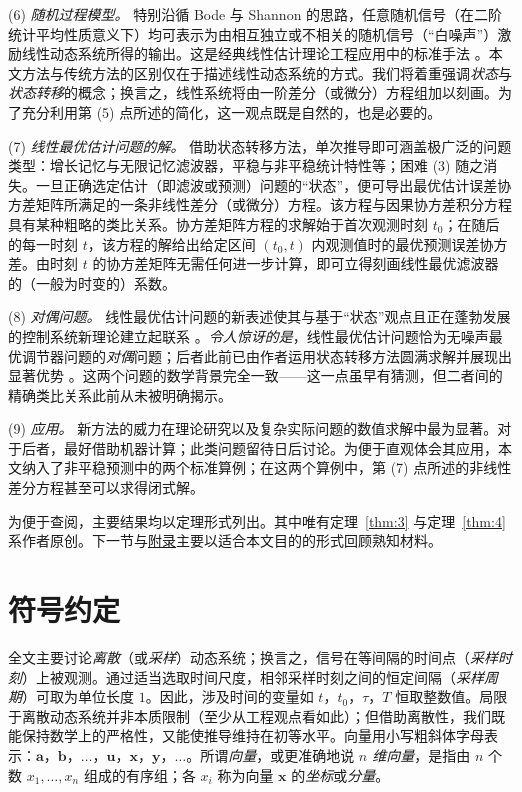(6) \emph{随机过程模型。} 特别沿循 Bode 与 Shannon \cite{r03} 的思路，任意随机信号（在二阶统计平均性质意义下）均可表示为由相互独立或不相关的随机信号（“白噪声”）激励线性动态系统所得的输出。这是经典线性估计理论工程应用中的标准手法 \cite{r02,r03,r04,r05,r06,r07}。本文方法与传统方法的区别仅在于描述线性动态系统的方式。我们将着重强调\emph{状态}与\emph{状态转移}的概念；换言之，线性系统将由一阶差分（或微分）方程组加以刻画。为了充分利用第 (5) 点所述的简化，这一观点既是自然的，也是必要的。


(7) \emph{线性最优估计问题的解。} 借助状态转移方法，单次推导即可涵盖极广泛的问题类型：增长记忆与无限记忆滤波器，平稳与非平稳统计特性等；困难 (3) 随之消失。一旦正确选定估计（即滤波或预测）问题的“状态”，便可导出最优估计误差协方差矩阵所满足的一条非线性差分（或微分）方程。该方程与因果协方差积分方程具有某种粗略的类比关系。协方差矩阵方程的求解始于首次观测时刻 $t_0$；在随后的每一时刻 $t$，该方程的解给出给定区间 $(t_0, t)$ 内观测值时的最优预测误差协方差。由时刻 $t$ 的协方差矩阵无需任何进一步计算，即可立得刻画线性最优滤波器的（一般为时变的）系数。

(8) \emph{对偶问题。} 线性最优估计问题的新表述使其与基于“状态”观点且正在蓬勃发展的控制系统新理论建立起联系 \cite{r17,r18,r19,r20,r21,r22,r23,r24}。\emph{令人惊讶的是}，线性最优估计问题恰为无噪声最优调节器问题的\emph{对偶}问题；后者此前已由作者运用状态转移方法圆满求解并展现出显著优势 \cite{r18,r23,r24}。这两个问题的数学背景完全一致——这一点虽早有猜测，但二者间的精确类比关系此前从未被明确揭示。

(9) \emph{应用。} 新方法的威力在理论研究以及复杂实际问题的数值求解中最为显著。对于后者，最好借助机器计算；此类问题留待日后讨论。为便于直观体会其应用，本文纳入了非平稳预测中的两个标准算例；在这两个算例中，第 (7) 点所述的非线性差分方程甚至可以求得闭式解。

为便于查阅，主要结果均以定理形式列出。其中唯有定理~\ref{thm:3} 与定理~\ref{thm:4} 系作者原创。下一节与\hyperref[sec:appendix]{附录}主要以适合本文目的的形式回顾熟知材料。

\section{符号约定}\label{sec:notation}

全文主要讨论\emph{离散}（或\emph{采样}）动态系统；换言之，信号在等间隔的时间点（\emph{采样时刻}）上被观测。通过适当选取时间尺度，相邻采样时刻之间的恒定间隔（\emph{采样周期}）可取为单位长度 $1$。因此，涉及时间的变量如 $t$，$t_0$，$\tau$，$T$ 恒取整数值。局限于离散动态系统并非本质限制（至少从工程观点看如此）；但借助离散性，我们既能保持数学上的严格性，又能使推导维持在初等水平。向量用小写粗斜体字母表示：$\bm{a}$，$\bm{b}$，$\dots$，$\bm{u}$，$\bm{x}$，$\bm{y}$，$\dots$。所谓\emph{向量}，或更准确地说 \emph{$n$ 维向量}，是指由 $n$ 个数 $x_1, \dots, x_n$ 组成的有序组；各 $x_i$ 称为向量 $\bm{x}$ 的\emph{坐标}或\emph{分量}。

